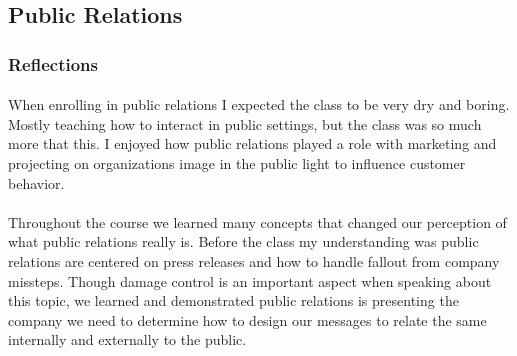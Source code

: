 \documentclass[12pt,titlepage]{article}
\begin{document}

\restoregeometry



\restoregeometry



\subsection{Public Relations}
\subsubsection{Reflections}
\paragraph {}
When enrolling in public relations I expected the class to be very dry and boring. Mostly teaching how to interact in public settings, but the class was so much more that this. I enjoyed how public relations played a role with marketing and projecting on organizations image in the public light to influence customer behavior.
\paragraph {}
Throughout the course we learned many concepts that changed our perception of what public relations really is. Before the class my understanding was public relations are centered on press releases and how to handle fallout from company missteps. Though damage control is an important aspect when speaking about this topic, we learned and demonstrated public relations is presenting the company we need to determine how to design our messages to relate the same internally and externally to the public.
\end{document}
